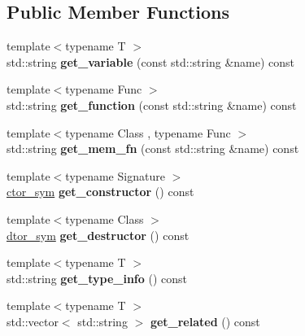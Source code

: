 \subsection*{Public Member Functions}
\begin{DoxyCompactItemize}
\item 
\mbox{\label{a01364_ad74cc7b52590619dcb164c1b4fe19e97}} 
{\footnotesize template$<$typename T $>$ }\\std\+::string {\bfseries get\+\_\+variable} (const std\+::string \&name) const
\item 
\mbox{\label{a01364_a67b1e39b2894517898622344a84dfc29}} 
{\footnotesize template$<$typename Func $>$ }\\std\+::string {\bfseries get\+\_\+function} (const std\+::string \&name) const
\item 
\mbox{\label{a01364_a86174e9c81817ca73268dd4e8fdabfa8}} 
{\footnotesize template$<$typename Class , typename Func $>$ }\\std\+::string {\bfseries get\+\_\+mem\+\_\+fn} (const std\+::string \&name) const
\item 
\mbox{\label{a01364_a35d77f954894cd648e6c8de4ec0fab2b}} 
{\footnotesize template$<$typename Signature $>$ }\\\hyperlink{a01372}{ctor\+\_\+sym} {\bfseries get\+\_\+constructor} () const
\item 
\mbox{\label{a01364_a1547d44546d8f2861b50c20076352e4a}} 
{\footnotesize template$<$typename Class $>$ }\\\hyperlink{a01376}{dtor\+\_\+sym} {\bfseries get\+\_\+destructor} () const
\item 
\mbox{\label{a01364_a3202a0f2c0116e921c523ad3a00774b8}} 
{\footnotesize template$<$typename T $>$ }\\std\+::string {\bfseries get\+\_\+type\+\_\+info} () const
\item 
\mbox{\label{a01364_a326ed07303bb4006e9adb13e215a8e0d}} 
{\footnotesize template$<$typename T $>$ }\\std\+::vector$<$ std\+::string $>$ {\bfseries get\+\_\+related} () const
\item 
\mbox{\label{a01364_ad74cc7b52590619dcb164c1b4fe19e97}} 

\end{DoxyCompactItemize}
